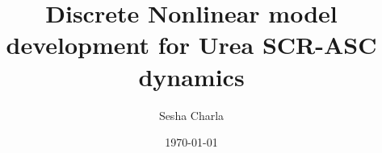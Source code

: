\documentclass[letterpaper, 11pt]{article}
\title{Discrete Nonlinear model development for Urea SCR-ASC dynamics}
\author{Sesha Charla}
\date{\today}
\begin{document}
\maketitle
\tableofcontents

\newpage

\newpage












\nocite{}


% 
\end{document}
